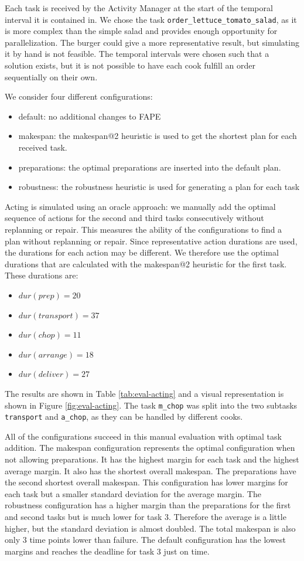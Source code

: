 Each task is received by the Activity Manager at the start of the temporal interval it is contained in.
We chose the task \verb|order_lettuce_tomato_salad|, as it is more complex than the simple salad and provides enough opportunity for parallelization.
The burger could give a more representative result, but simulating it by hand is not feasible.
The temporal intervals were chosen such that a solution exists, but it is not possible to have each cook fulfill an order sequentially on their own.

We consider four different configurations:
\begin{itemize}
  \item default: no additional changes to FAPE
  \item makespan: the makespan@2 heuristic is used to get the shortest plan for each received task.
  \item preparations: the optimal preparations are inserted into the default plan.
  \item robustness: the robustness heuristic is used for generating a plan for each task
\end{itemize}

Acting is simulated using an oracle approach: we manually add the optimal sequence of actions for the second and third tasks consecutively without replanning or repair.
This measures the ability of the configurations to find a plan without replanning or repair.
Since representative action durations are used, the durations for each action may be different.
We therefore use the optimal durations that are calculated with the makespan@2 heuristic for the first task.
These durations are: 
\begin{itemize}
  \item $dur(prep)=20$
  \item $dur(transport)=37$
  \item $dur(chop)=11$
  \item $dur(arrange)=18$
  \item $dur(deliver)=27$
\end{itemize}

The results are shown in Table \ref{tab:eval-acting} and a visual representation is shown in Figure \ref{fig:eval-acting}.
The task \verb|m_chop| was split into the two subtasks \verb|transport| and \verb|a_chop|, as they can be handled by different cooks. 

All of the configurations succeed in this manual evaluation with optimal task addition.
The makespan configuration represents the optimal configuration when not allowing preparations.
It has the highest margin for each task and the highest average margin.
It also has the shortest overall makespan.
The preparations have the second shortest overall makespan.
This configuration has lower margins for each task but a smaller standard deviation for the average margin.
The robustness configuration has a higher margin than the preparations for the first and second tasks but is much lower for task 3.
Therefore the average is a little higher, but the standard deviation is almost doubled.
The total makespan is also only 3 time points lower than failure.
The default configuration has the lowest margins and reaches the deadline for task 3 just on time.

